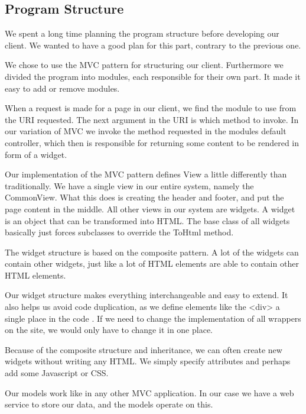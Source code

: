 \subsection{Program Structure}
We spent a long time planning the program structure before developing our client. We wanted to have a good plan for this part, contrary to the previous one.

We chose to use the MVC pattern for structuring our client.
Furthermore we divided the program into modules, each responsible for their own part. It made it easy to add or remove modules.

When a request is made for a page in our client, we find the module to use from the URI requested.
The next argument in the URI is which method to invoke. In our variation of MVC we invoke the method requested in the modules default controller, which then is responsible for returning some content to be rendered in form of a widget.

Our implementation of the MVC pattern defines View a little differently than traditionally.
We have a single view in our entire system, namely the CommonView.
What this does is creating the header and footer, and put the page content in the middle.
All other views in our system are widgets. A widget is an object that can be transformed into HTML.
The base class of all widgets basically just forces subclasses to override the ToHtml method.

The widget structure is based on the composite pattern. A lot of the widgets can contain other widgets, just like a lot of HTML elements are able to contain other HTML elements.

Our widget structure makes everything interchangeable and easy to extend. It also helps us avoid code duplication, as we define elements like the <div> a single place in the code . If we need to change the implementation of all wrappers on the site, we would only have to change it in one place.

Because of the composite structure and inheritance, we can often create new widgets without writing any HTML. We simply specify attributes and perhaps add some Javascript or CSS.

Our models work like in any other MVC application. In our case we have a web service to store our data, and the models operate on this.
\newpage